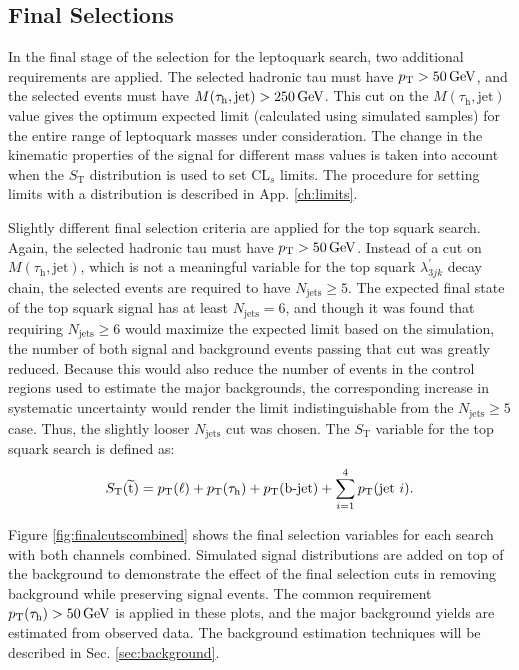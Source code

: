 \documentclass[12pt]{thesis}  %
\newcommand{\tauh}{\ensuremath{\tau_{\text{h}}}\xspace}
\def\ST{\ensuremath{S_{\text{T}}}\xspace}
\def\MassTJ{\ensuremath{M(\tauh,\text{jet})}\xspace}
\begin{document}

\subsection{Final Selections}

In the final stage of the selection for the leptoquark search, two additional requirements are applied. The selected hadronic tau must have $p_{\mathrm{T}}>50\,\text{Ge\hspace{-.08em}V}$, and the selected events must have $\MassTJ>250\GeV$. This cut on the \MassTJ value gives the optimum expected limit (calculated using simulated samples) for the entire range of leptoquark masses under consideration. The change in the kinematic properties of the signal for different mass values is taken into account when the \ST distribution is used to set $\text{CL}_{s}$ limits. The procedure for setting limits with a distribution is described in App. \ref{ch:limits}.

Slightly different final selection criteria are applied for the top squark search. Again, the selected hadronic tau must have $p_{\mathrm{T}}>50\,\text{Ge\hspace{-.08em}V}$. Instead of a cut on \MassTJ, which is not a meaningful variable for the top squark $\lambda^{\prime}_{3jk}$ decay chain, the selected events are required to have $N_{\text{jets}}\geq5$. The expected final state of the top squark signal has at least $N_{\text{jets}}=6$, and though it was found that requiring $N_{\text{jets}}\geq6$ would maximize the expected limit based on the simulation, the number of both signal and background events passing that cut was greatly reduced. Because this would also reduce the number of events in the control regions used to estimate the major backgrounds, the corresponding increase in systematic uncertainty would render the limit indistinguishable from the $N_{\text{jets}}\geq5$ case. Thus, the slightly looser $N_{\text{jets}}$ cut was chosen. The \ST variable for the top squark search is defined as:
\begin{equation}
\label{eq:STstop}
\ST(\sTop) = \pt(\ell) + \pt(\tauh) + \pt(\text{b-jet}) + \sum_{i=1}^{4}\pt(\text{jet }i).
\end{equation}

Figure \ref{fig:finalcutscombined} shows the final selection variables for each search with both channels combined. Simulated signal distributions are added on top of the background to demonstrate the effect of the final selection cuts in removing background while preserving signal events. The common requirement $\pt(\tauh)>50\GeV$ is applied in these plots, and the major background yields are estimated from observed data. The background estimation techniques will be described in Sec. \ref{sec:background}.
\end{document}
